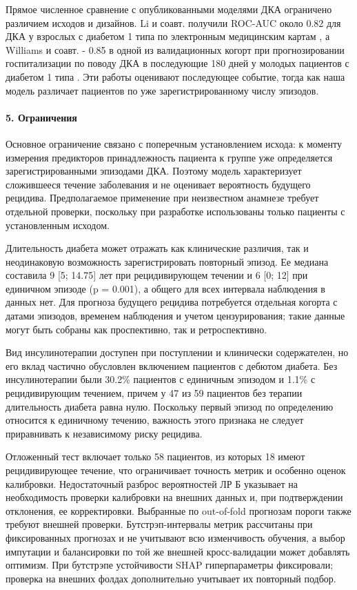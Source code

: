 \documentclass{crm-article}
\begin{document}
Прямое численное сравнение с опубликованными моделями ДКА ограничено различием исходов и дизайнов. Li и соавт. получили ROC-AUC около 0.82 для ДКА у взрослых с диабетом 1 типа по электронным медицинским картам \cite{ref10}, а Williams и соавт. - 0.85 в одной из валидационных когорт при прогнозировании госпитализации по поводу ДКА в последующие 180 дней у молодых пациентов с диабетом 1 типа \cite{ref9}. Эти работы оценивают последующее событие, тогда как наша модель различает пациентов по уже зарегистрированному числу эпизодов.

\paragraph{5. Ограничения}\label{sec5}

Основное ограничение связано с поперечным установлением исхода: к моменту измерения предикторов принадлежность пациента к группе уже определяется зарегистрированными эпизодами ДКА. Поэтому модель характеризует сложившееся течение заболевания и не оценивает вероятность будущего рецидива. Предполагаемое применение при неизвестном анамнезе требует отдельной проверки, поскольку при разработке использованы только пациенты с установленным исходом.

Длительность диабета может отражать как клинические различия, так и неодинаковую возможность зарегистрировать повторный эпизод. Ее медиана составила 9 [5; 14.75] лет при рецидивирующем течении и 6 [0; 12] при единичном эпизоде (p = 0.001), а общего для всех интервала наблюдения в данных нет. Для прогноза будущего рецидива потребуется отдельная когорта с датами эпизодов, временем наблюдения и учетом цензурирования; такие данные могут быть собраны как проспективно, так и ретроспективно.

Вид инсулинотерапии доступен при поступлении и клинически содержателен, но его вклад частично обусловлен включением пациентов с дебютом диабета. Без инсулинотерапии были 30.2\% пациентов с единичным эпизодом и 1.1\% с рецидивирующим течением, причем у 47 из 59 пациентов без терапии длительность диабета равна нулю. Поскольку первый эпизод по определению относится к единичному течению, важность этого признака не следует приравнивать к независимому риску рецидива.

Отложенный тест включает только 58 пациентов, из которых 18 имеют рецидивирующее течение, что ограничивает точность метрик и особенно оценок калибровки. Недостаточный разброс вероятностей ЛР Б указывает на необходимость проверки калибровки на внешних данных и, при подтверждении отклонения, ее корректировки. Выбранные по out-of-fold прогнозам пороги также требуют внешней проверки. Бутстрэп-интервалы метрик рассчитаны при фиксированных прогнозах и не учитывают всю изменчивость обучения, а выбор импутации и балансировки по той же внешней кросс-валидации может добавлять оптимизм. При бутстрэпе устойчивости SHAP гиперпараметры фиксировали; проверка на внешних фолдах дополнительно учитывает их повторный подбор.
\end{document}
